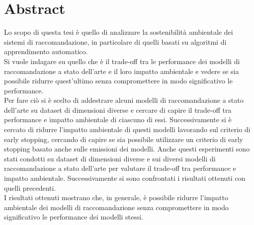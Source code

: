 \section{Abstract}

Lo scopo di questa tesi è quello di analizzare la sostenibilità ambientale dei sistemi di raccomandazione, in particolare di quelli basati su algoritmi di apprendimento automatico.\\
Si vuole indagare su quello che è il trade-off tra le performance dei modelli di raccomandazione a stato dell'arte e il loro impatto ambientale e vedere se sia possibile ridurre quest'ultimo senza compromettere in modo significativo le performance.\\
Per fare ciò si è scelto di addestrare alcuni modelli di raccomandazione a stato dell'arte su dataset di dimensioni diverse e cercare di capire il trade-off tra performance e impatto ambientale di ciascuno di essi. Successivamente si è cercato di ridurre l'impatto ambientale di questi modelli lavorando sul criterio di early stopping, cercando di capire se sia possibile utilizzare un criterio di early stopping basato anche sulle emissioni dei modelli. Anche questi esperimenti sono stati condotti su dataset di dimensioni diverse e sui diversi modelli di raccomandazione a stato dell'arte per valutare il trade-off tra performance e impatto ambientale. Successivamente si sono confrontati i risultati ottenuti con quelli precedenti. \\I risultati ottenuti mostrano che, in generale, è possibile ridurre l'impatto ambientale dei modelli di raccomandazione senza compromettere in modo significativo le performance dei modelli stessi.